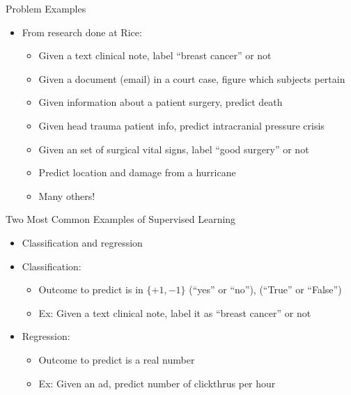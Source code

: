 \documentclass[aspectratio=169]{beamer}
\begin{document}
\begin{frame}{Problem Examples}

\begin{itemize}
\item From research done at Rice:
\begin{itemize}
                \item Given a text clinical note, label ``breast cancer'' or not
                \item Given a document (email) in a court case, figure which subjects pertain %
                \item Given information about a patient surgery, predict death
		\item Given head trauma patient info, predict intracranial pressure crisis
		\item Given an set of surgical vital signs, label ``good surgery'' or not %
		\item Predict location and damage from a hurricane
		\item Many others!
\end{itemize}
\end{itemize}
\end{frame}
\begin{frame}{Two Most Common Examples of Supervised Learning}

\begin{itemize}
\item Classification and regression
\item Classification:
	\begin{itemize}
	\item Outcome to predict is in $\{+1, -1\}$ (``yes'' or ``no''), (``True'' or ``False'')
	\item Ex: Given a text clinical note, label it as ``breast cancer'' or not
	\end{itemize}
\item Regression:
	\begin{itemize}
	\item Outcome to predict is a real number
	\item Ex: Given an ad, predict number of clickthrus per hour
	\end{itemize}
\end{itemize}
\end{frame}
\end{document}
